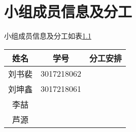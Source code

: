 \chapter{小组成员信息及分工}

小组成员信息及分工如表\ref{table::stuinfo1}

\begin{longtable}[]{@{}ccc@{}}
\label{table::stuinfo1}
\toprule
姓名 & 学号 & 分工安排\tabularnewline
\midrule
\endhead
刘书裴 & 3017218062 &\tabularnewline
刘坤鑫 & 3017218061 &\tabularnewline
李喆 & &\tabularnewline
芦源 & &\tabularnewline
\bottomrule
\end{longtable}
